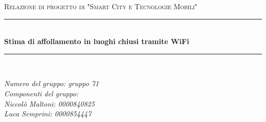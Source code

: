 \begin{titlepage}
  \newcommand{\HRule}{\rule{\linewidth}{0.5mm}}

  \center

  \textsc{\Large Relazione di progetto di "Smart City e Tecnologie Mobili"}\\[0.5cm]

  \HRule \\[0.4cm]
  { \huge \bfseries Stima di affollamento in luoghi chiusi tramite WiFi}\\[0.4cm]
  \HRule \\[1.5cm]

  \vfill

  \begin{flushleft}
  \emph{Numero del gruppo: gruppo 71}\\[1cm]
  \emph{%
    Componenti del gruppo:\\%
    Niccolò Maltoni: 0000840825\\%
    Luca Semprini: 0000854447%
  }\\[3cm]
  \end{flushleft}
\end{titlepage}
